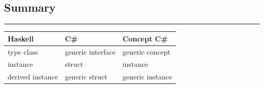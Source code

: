\subsection{Summary}\label{summary}

\begin{center}\rule{0.5\linewidth}{\linethickness}\end{center}

\begin{longtable}[]{@{}lll@{}}
\toprule
\begin{minipage}[b]{0.14\columnwidth}\raggedright\strut
Haskell\strut
\end{minipage} & \begin{minipage}[b]{0.11\columnwidth}\raggedright\strut
C\#\strut
\end{minipage} & \begin{minipage}[b]{0.11\columnwidth}\raggedright\strut
Concept C\#\strut
\end{minipage}\tabularnewline
\midrule
\endhead
\begin{minipage}[t]{0.14\columnwidth}\raggedright\strut
type class\strut
\end{minipage} & \begin{minipage}[t]{0.11\columnwidth}\raggedright\strut
generic interface\strut
\end{minipage} & \begin{minipage}[t]{0.11\columnwidth}\raggedright\strut
generic concept\strut
\end{minipage}\tabularnewline
\begin{minipage}[t]{0.14\columnwidth}\raggedright\strut
instance\strut
\end{minipage} & \begin{minipage}[t]{0.11\columnwidth}\raggedright\strut
struct\strut
\end{minipage} & \begin{minipage}[t]{0.11\columnwidth}\raggedright\strut
instance\strut
\end{minipage}\tabularnewline
\begin{minipage}[t]{0.14\columnwidth}\raggedright\strut
derived instance\strut
\end{minipage} & \begin{minipage}[t]{0.11\columnwidth}\raggedright\strut
generic struct\strut
\end{minipage} & \begin{minipage}[t]{0.11\columnwidth}\raggedright\strut
generic instance\strut
\end{minipage}\tabularnewline

\end{longtable}
